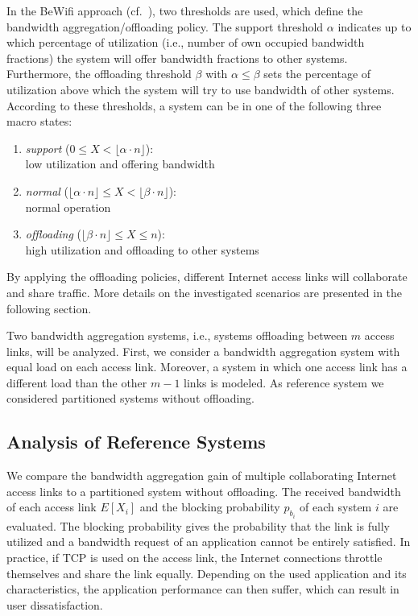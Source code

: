 In the BeWifi approach (cf.~), two thresholds are used, which define the bandwidth aggregation/offloading policy. The support threshold $\alpha$ indicates up to which percentage of utilization (i.e., number of own occupied bandwidth fractions) the system will offer bandwidth fractions to other systems. Furthermore, the offloading threshold $\beta$ with $\alpha\leq\beta$ sets the percentage of utilization above which the system will try to use bandwidth of other systems. According to these thresholds, a system can be in one of the following three macro states:

\begin{enumerate}
	\item \textit{support} ($0 \leq X < \lfloor\alpha\cdot n\rfloor$):\\ low utilization and offering bandwidth
	\item \textit{normal} ($\lfloor\alpha\cdot n\rfloor \leq X < \lfloor\beta\cdot n\rfloor$):\\ normal operation
	\item \textit{offloading} ($\lfloor\beta\cdot n\rfloor \leq X \leq n$):\\ high utilization and offloading to other systems
\end{enumerate}

By applying the offloading policies, different Internet access links will collaborate and share traffic. More details on the investigated scenarios are presented in the following section.

Two bandwidth aggregation systems, i.e., systems offloading between $m$ access links, will be analyzed. First, we consider a bandwidth aggregation system with equal load on each access link. Moreover, a system in which one access link has a different load than the other $m-1$ links is modeled. As reference system we considered partitioned systems without offloading.%

\subsection{Analysis of Reference Systems}

We compare the bandwidth aggregation gain of multiple collaborating Internet access links to a partitioned system without offloading. %
The received bandwidth of each access link $E[X_i]$ and the blocking probability $p_{b_i}$ of each system $i$ are evaluated. The blocking probability gives the probability that the link is fully utilized and a bandwidth request of an application cannot be entirely satisfied. In practice, if TCP is used on the access link, the Internet connections throttle themselves and share the link equally. Depending on the used application and its characteristics, the application performance can then suffer, which can result in user dissatisfaction.

